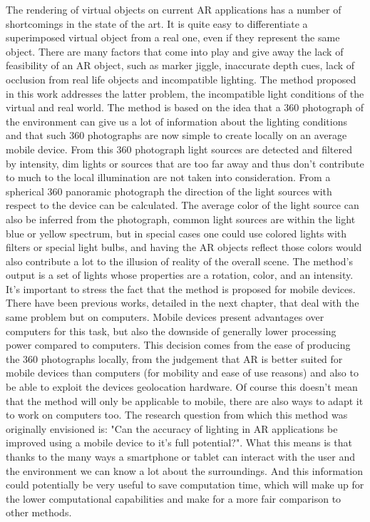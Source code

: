 
The rendering of virtual objects on current AR applications has a number of shortcomings in the state of the art. It is quite easy to differentiate a superimposed virtual object from a real one, even if they represent the same object. There are many factors that come into play and give away the lack of feasibility of an AR object, such as marker jiggle, inaccurate depth cues, lack of occlusion from real life objects and incompatible lighting.
The method proposed in this work addresses the latter problem, the incompatible light conditions of the virtual and real world. The method is based on the idea that a 360 photograph of the environment can give us a lot of information about the lighting conditions and that such 360 photographs are now simple to create locally on an average mobile device. From this 360 photograph light sources are detected and filtered by intensity, dim lights or sources that are too far away and thus don't contribute to much to the local illumination are not taken into consideration. From a spherical 360 panoramic photograph the direction of the light sources with respect to the device can be calculated. The average color of the light source can also be inferred from the photograph, common light sources are within the light blue or yellow spectrum, but in special cases one could use colored lights with filters or special light bulbs, and having the AR objects reflect those colors would also contribute a lot to the illusion of reality of the overall scene. \newline
The method's output is a set of lights whose properties are a rotation, color, and an intensity.
It's important to stress the fact that the method is proposed for mobile devices. There have been previous works, detailed in the next chapter, that deal with the same problem but on computers. Mobile devices present advantages over computers for this task, but also the downside of generally lower processing power compared to computers. This decision comes from the ease of producing the 360 photographs locally, from the judgement that AR is better suited for mobile devices than computers (for mobility and ease of use reasons) and also to be able to exploit the devices geolocation hardware. Of course this doesn't mean that the method will only be applicable to mobile, there are also ways to adapt it to work on computers too.\newline
The research question from which this method was originally envisioned is: "Can the accuracy of lighting in AR applications be improved using a mobile device to it's full potential?". What this means is that thanks to the many ways a smartphone or tablet can interact with the user and the environment we can know a lot about the surroundings. And this information could potentially be very useful to save computation time, which will make up for the lower computational capabilities and make for a more fair comparison to other methods.\newline
